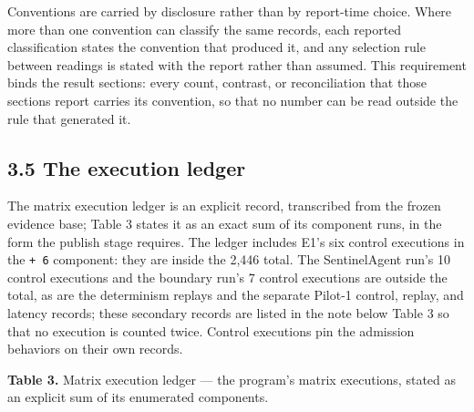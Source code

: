 \documentclass[
  10pt,
]{article}
\let\origtexttt\texttt
\renewcommand{\texttt}[1]{{\upshape\origtexttt{#1}}}
\renewcommand{\_}{\origunderscore\allowbreak}
\begin{document}
Conventions are carried by disclosure rather than by report-time choice.
Where more than one convention can classify the same records, each
reported classification states the convention that produced it, and any
selection rule between readings is stated with the report rather than
assumed. This requirement binds the result sections: every count,
contrast, or reconciliation that those sections report carries its
convention, so that no number can be read outside the rule that
generated it.

\subsection{3.5 The execution ledger}\label{the-execution-ledger}

The matrix execution ledger is an explicit record, transcribed from the
frozen evidence base; Table 3 states it as an exact sum of its component
runs, in the form the publish stage requires. The ledger includes E1's
six control executions in the \texttt{+\ 6} component: they are inside
the 2,446 total. The SentinelAgent run's 10 control executions and the
boundary run's 7 control executions are outside the total, as are the
determinism replays and the separate Pilot-1 control, replay, and
latency records; these secondary records are listed in the note below
Table 3 so that no execution is counted twice. Control executions pin
the admission behaviors on their own records.

\textbf{Table 3.} Matrix execution ledger --- the program's matrix
executions, stated as an explicit sum of its enumerated components.
\end{document}
